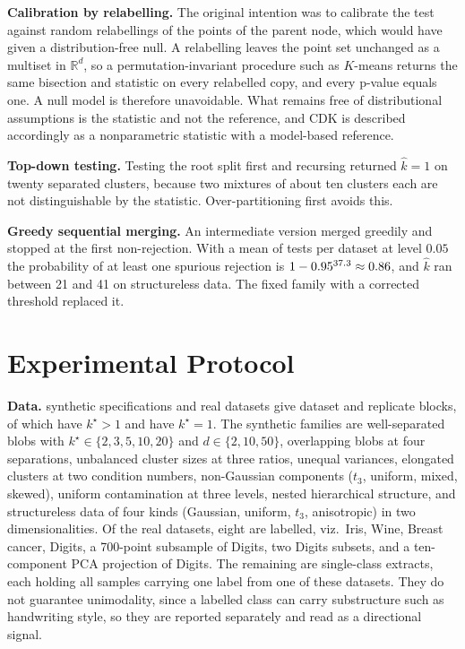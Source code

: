 \documentclass[runningheads]{llncs}
\begin{document}
\noindent\textbf{Calibration by relabelling.} The original intention was to
calibrate the test against random relabellings of the points of the parent
node, which would have given a distribution-free null. A relabelling leaves the
point set unchanged as a multiset in $\mathbb{R}^d$, so a permutation-invariant
procedure such as $K$-means returns the same bisection and statistic on every
relabelled copy, and every p-value equals one. A null model is therefore
unavoidable. What remains free of distributional assumptions is the statistic
and not the reference, and CDK is described accordingly as a nonparametric
statistic with a model-based reference.

\medskip\noindent\textbf{Top-down testing.} Testing the root split first and
recursing returned $\hat k = 1$ on twenty separated clusters, because two
mixtures of about ten clusters each are not distinguishable by the statistic.
Over-partitioning first avoids this.

\medskip\noindent\textbf{Greedy sequential merging.} An intermediate version
merged greedily and stopped at the first non-rejection. With a mean of
\nCDKNTEST{} tests per dataset at level $0.05$ the probability of at least one
spurious rejection is $1 - 0.95^{37.3{}} \approx 0.86$, and $\hat k$ ran
between 21 and 41 on structureless data. The fixed family with a corrected
threshold replaced it.

\section{Experimental Protocol}
\label{sec:proto}

\noindent\textbf{Data.} \nNSYNSPEC{} synthetic specifications and
\nNREALSET{} real datasets give \nNBLOCK{} dataset and replicate blocks, of
which \nNSTRUCT{} have $k^\star > 1$ and \nNNULLB{} have $k^\star = 1$. The
synthetic families are well-separated blobs with
$k^\star \in \{2,3,5,10,20\}$ and $d \in \{2,10,50\}$, overlapping blobs at
four separations, unbalanced cluster sizes at three ratios, unequal variances,
elongated clusters at two condition numbers, non-Gaussian components ($t_3$,
uniform, mixed, skewed), uniform contamination at three levels, nested
hierarchical structure, and structureless data of four kinds (Gaussian,
uniform, $t_3$, anisotropic) in two dimensionalities. Of the real datasets,
eight are labelled, viz.\ Iris, Wine, Breast cancer, Digits, a 700-point
subsample of Digits, two Digits subsets, and a ten-component PCA projection of
Digits. The remaining \nNREALNULL{} are single-class extracts, each holding
all samples carrying one label from one of these datasets. They do not
guarantee unimodality, since a labelled class can carry substructure such as
handwriting style, so they are reported separately and read as a directional
signal.
\end{document}
